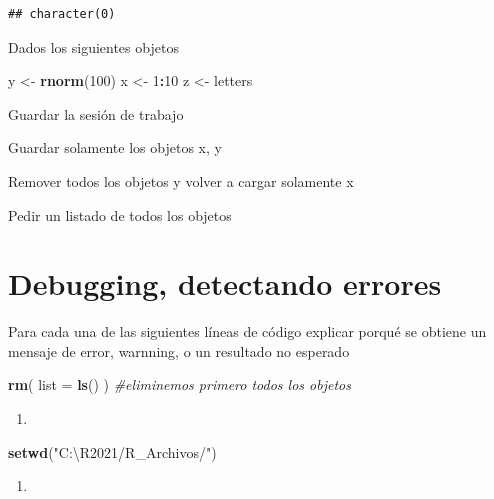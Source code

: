 \documentclass[]{book}
\newenvironment{Shaded}{\begin{snugshade}}{\end{snugshade}}
\newcommand{\CommentTok}[1]{\textcolor[rgb]{0.56,0.35,0.01}{\textit{#1}}}
\newcommand{\DataTypeTok}[1]{\textcolor[rgb]{0.13,0.29,0.53}{#1}}
\newcommand{\DecValTok}[1]{\textcolor[rgb]{0.00,0.00,0.81}{#1}}
\newcommand{\KeywordTok}[1]{\textcolor[rgb]{0.13,0.29,0.53}{\textbf{#1}}}
\newcommand{\NormalTok}[1]{#1}
\newcommand{\OperatorTok}[1]{\textcolor[rgb]{0.81,0.36,0.00}{\textbf{#1}}}
\newcommand{\StringTok}[1]{\textcolor[rgb]{0.31,0.60,0.02}{#1}}
\begin{document}
\begin{verbatim}
## character(0)
\end{verbatim}

Dados los siguientes objetos

\begin{Shaded}
\begin{Highlighting}[]
\NormalTok{y <-}\StringTok{ }\KeywordTok{rnorm}\NormalTok{(}\DecValTok{100}\NormalTok{)}
\NormalTok{x <-}\StringTok{ }\DecValTok{1}\OperatorTok{:}\DecValTok{10}
\NormalTok{z <-}\StringTok{ }\NormalTok{letters}
\end{Highlighting}
\end{Shaded}

Guardar la sesión de trabajo

Guardar solamente los objetos x, y

Remover todos los objetos y volver a cargar solamente x

Pedir un listado de todos los objetos

\hypertarget{debugging-detectando-errores-2}{%
\section{Debugging, detectando errores}\label{debugging-detectando-errores-2}}

Para cada una de las siguientes líneas de código explicar porqué se obtiene un mensaje de error, warnning, o un resultado no esperado

\begin{Shaded}
\begin{Highlighting}[]
\KeywordTok{rm}\NormalTok{( }\DataTypeTok{list =} \KeywordTok{ls}\NormalTok{() ) }\CommentTok{#eliminemos primero todos los objetos}
\end{Highlighting}
\end{Shaded}

\begin{enumerate}
\def\labelenumi{\arabic{enumi}.}
\item
\end{enumerate}

\begin{Shaded}
\begin{Highlighting}[]
\KeywordTok{setwd}\NormalTok{(}\StringTok{"C:\textbackslash{}R2021/R_Archivos/"}\NormalTok{)}
\end{Highlighting}
\end{Shaded}

\begin{enumerate}
\def\labelenumi{\arabic{enumi}.}
\setcounter{enumi}{1}
\item
\end{enumerate}
\end{document}
